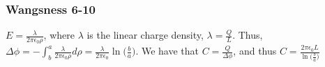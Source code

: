 \documentclass[crop=false,class=article,oneside]{standalone}
\begin{document}
        \subsubsection{Wangsness 6-10}
        $E=\frac{\lambda}{2\pi \epsilon_0 \rho}$, where $\lambda$ is the linear charge density, $\lambda = \frac{Q}{L}$. Thus, $\Delta\phi = - \int_{b}^{a} \frac{\lambda}{2\pi \epsilon_0\rho}d\rho = \frac{\lambda}{2\pi \epsilon_0}\ln\big(\frac{b}{a}\big)$. We have that $C=\frac{Q}{\Delta\phi}$, and thus $C = \frac{2\pi \epsilon_0 L}{\ln\big(\frac{b}{a}\big)}$
\end{document}
